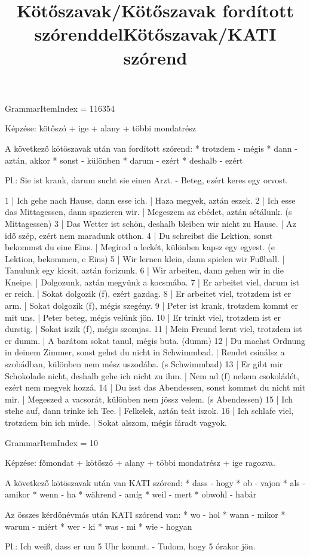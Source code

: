 \title{Kötőszavak/Kötőszavak fordított szórenddel}

GrammarItemIndex = 116354

\begin{desc}
Képzése: kötőszó + ige + alany + többi mondatrész

A következő kötöszavak után van fordított szórend:
* trotzdem - mégis
* dann - aztán, akkor
* sonst - különben
* darum - ezért
* deshalb - ezért

Pl.: Sie ist krank, darum sucht sie einen Arzt. - Beteg, ezért keres egy orvost.
\end{desc}

\begin{exmp}
1 | Ich gehe nach Hause, dann esse ich. | Haza megyek, aztán eszek.
2 | Ich esse das Mittagessen, dann spazieren wir. | Megeszem az ebédet, aztán sétálunk. (s Mittagessen)
3 | Das Wetter ist schön, deshalb bleiben wir nicht zu Hause. | Az idő szép, ezért nem maradunk otthon.
4 | Du schreibst die Lektion, sonst bekommst du eine Eins. | Megírod a leckét, különben kapsz egy egyest. (e Lektion, bekommen, e Eins)
5 | Wir lernen klein, dann spielen wir Fußball. | Tanulunk egy kicsit, aztán focizunk.
6 | Wir arbeiten, dann gehen wir in die Kneipe. | Dolgozunk, aztán megyünk a kocsmába.
7 | Er arbeitet viel, darum ist er reich. | Sokat dolgozik (f), ezért gazdag.
8 | Er arbeitet viel, trotzdem ist er arm. | Sokat dolgozik (f), mégis szegény.
9 | Peter ist krank, trotzdem kommt er mit uns. | Peter beteg, mégis velünk jön.
10 | Er trinkt viel, trotzdem ist er durstig. | Sokat iszik (f), mégis szomjas.
11 | Mein Freund lernt viel, trotzdem ist er dumm. | A barátom sokat tanul, mégis buta. (dumm)
12 | Du machst Ordnung in deinem Zimmer, sonst gehst du nicht in Schwimmbad. | Rendet csinálsz a szobádban, különben nem mész uszodába. (s Schwimmbad)
13 | Er gibt mir Schokolade nicht, deshalb gehe ich nicht zu ihm. | Nem ad (f) nekem csokoládét, ezért nem megyek hozzá.
14 | Du isst das Abendessen, sonst kommst du nicht mit mir. | Megeszed a vacsorát, különben nem jössz velem. (s Abendessen)
15 | Ich stehe auf, dann trinke ich Tee. | Felkelek, aztán teát iszok.
16 | Ich schlafe viel, trotzdem bin ich müde. | Sokat alszom, mégis fáradt vagyok.
\end{exmp}

\title{Kötőszavak/KATI szórend}

GrammarItemIndex = 10

\begin{desc}
Képzése:
főmondat + kötőszó + alany + többi mondatrész + ige ragozva.

A következő kötöszavak után van KATI szórend:
* dass - hogy
* ob - vajon
* als - amikor
* wenn - ha
* während - amíg
* weil - mert
* obwohl - habár

Az összes kérdőnévmás után KATI szórend van:
* wo - hol
* wann - mikor
* warum - miért
* wer - ki
* was - mi
* wie - hogyan

Pl.: Ich weiß, dass er um 5 Uhr kommt. - Tudom, hogy 5 órakor jön.
\end{desc}

